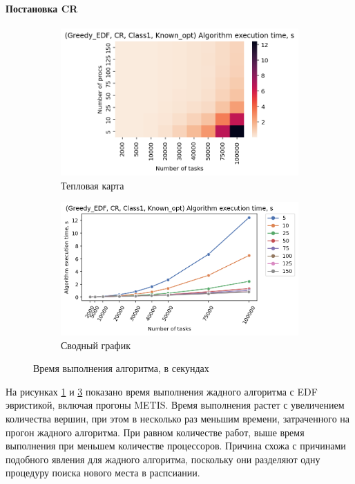 \paragraph{Постановка CR}

\begin{figure}[!htbp]
    \centering
    \begin{subfigure}{0.49\textwidth}
        \includegraphics[width=\textwidth]{imgs/ideal_1/CR_EDF/et_heatmap.png}
        \caption{Тепловая карта}
        \label{fig:CR-EDF-exec-time-heatmap}
    \end{subfigure}
    \hfill
    \begin{subfigure}{0.49\textwidth}
        \includegraphics[width=\textwidth]{imgs/ideal_1/CR_EDF/tr_graph.png}
        \caption{Сводный график}
        \label{fig:CR-EDF-exec-time-compiled}
    \end{subfigure}
    \caption{Время выполнения алгоритма, в секундах}
\end{figure}

На рисунках \ref{fig:CR-EDF-exec-time-heatmap} и \ref{fig:CR-EDF-exec-time-compiled} показано время выполнения жадного алгоритма с EDF эвристикой, включая прогоны METIS. Время выполнения растет с увеличением количества вершин, при этом в несколько раз меньшим времени, затраченного на прогон жадного алгоритма. При равном количестве работ, выше время выполнения при меньшем количестве процессоров. Причина схожа с причинами подобного явления для жадного алгоритма, поскольку они разделяют одну процедуру поиска нового места в распсиании. 

